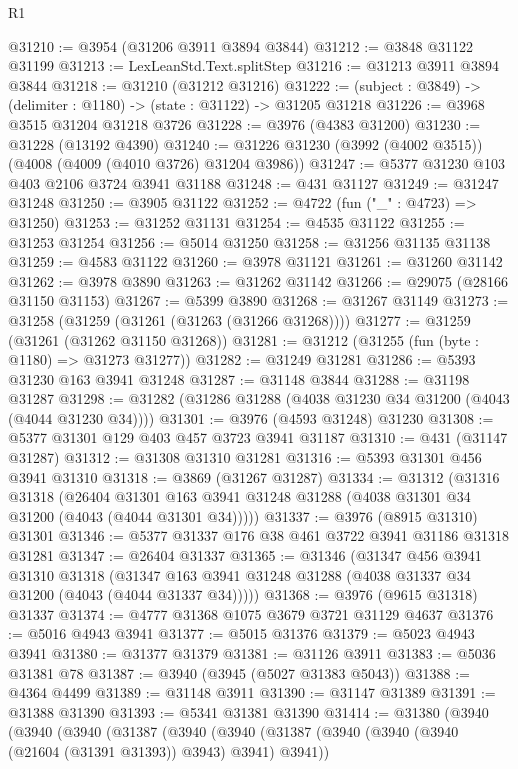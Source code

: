 \begin{lexlean}{R1}
\begin{coremodule}
@31210 := @3954 (@31206 @3911 @3894 @3844)
@31212 := @3848 @31122 @31199
@31213 := LexLeanStd.Text.splitStep
@31216 := @31213 @3911 @3894 @3844
@31218 := @31210 (@31212 @31216)
@31222 := (subject : @3849) -> (delimiter : @1180) -> (state : @31122) -> @31205 @31218
@31226 := @3968 @3515 @31204 @31218 @3726
@31228 := @3976 (@4383 @31200)
@31230 := @31228 (@13192 @4390)
@31240 := @31226 @31230 (@3992 (@4002 @3515)) (@4008 (@4009 (@4010 @3726) @31204 @3986))
@31247 := @5377 @31230 @103 @403 @2106 @3724 @3941 @31188
@31248 := @431 @31127
@31249 := @31247 @31248
@31250 := @3905 @31122
@31252 := @4722 (fun ("_" : @4723) => @31250)
@31253 := @31252 @31131
@31254 := @4535 @31122
@31255 := @31253 @31254
@31256 := @5014 @31250
@31258 := @31256 @31135 @31138
@31259 := @4583 @31122
@31260 := @3978 @31121
@31261 := @31260 @31142
@31262 := @3978 @3890
@31263 := @31262 @31142
@31266 := @29075 (@28166 @31150 @31153)
@31267 := @5399 @3890
@31268 := @31267 @31149
@31273 := @31258 (@31259 (@31261 (@31263 (@31266 @31268))))
@31277 := @31259 (@31261 (@31262 @31150 @31268))
@31281 := @31212 (@31255 (fun (byte : @1180) => @31273 @31277))
@31282 := @31249 @31281
@31286 := @5393 @31230 @163 @3941 @31248
@31287 := @31148 @3844
@31288 := @31198 @31287
@31298 := @31282 (@31286 @31288 (@4038 @31230 @34 @31200 (@4043 (@4044 @31230 @34))))
@31301 := @3976 (@4593 @31248) @31230
@31308 := @5377 @31301 @129 @403 @457 @3723 @3941 @31187
@31310 := @431 (@31147 @31287)
@31312 := @31308 @31310 @31281
@31316 := @5393 @31301 @456 @3941 @31310
@31318 := @3869 (@31267 @31287)
@31334 := @31312
    (@31316
      @31318
      (@26404 @31301 @163 @3941 @31248 @31288 (@4038 @31301 @34 @31200 (@4043 (@4044 @31301 @34)))))
@31337 := @3976 (@8915 @31310) @31301
@31346 := @5377 @31337 @176 @38 @461 @3722 @3941 @31186 @31318 @31281
@31347 := @26404 @31337
@31365 := @31346
    (@31347
      @456
      @3941
      @31310
      @31318
      (@31347 @163 @3941 @31248 @31288 (@4038 @31337 @34 @31200 (@4043 (@4044 @31337 @34)))))
@31368 := @3976 (@9615 @31318) @31337
@31374 := @4777 @31368 @1075 @3679 @3721 @31129 @4637
@31376 := @5016 @4943 @3941
@31377 := @5015 @31376
@31379 := @5023 @4943 @3941
@31380 := @31377 @31379
@31381 := @31126 @3911
@31383 := @5036 @31381 @78
@31387 := @3940 (@3945 (@5027 @31383 @5043))
@31388 := @4364 @4499
@31389 := @31148 @3911
@31390 := @31147 @31389
@31391 := @31388 @31390
@31393 := @5341 @31381 @31390
@31414 := @31380
    (@3940
      (@3940
        (@3940
          (@31387
            (@3940
              (@3940
                (@31387 (@3940 (@3940 (@3940 (@21604 (@31391 @31393)) @3943) @3941) @3941))

\end{coremodule}
\end{lexlean}
